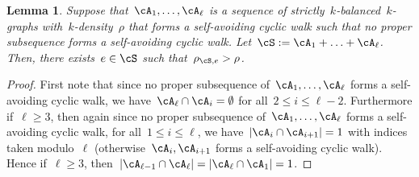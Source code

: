 \documentclass[11pt]{amsart}
\DeclarePairedDelimiter{\abs}{\lvert}{\rvert}
\newtheorem{lemma}[algocf]{Lemma}
\theoremstyle{definition}
\numberwithin{equation}{section}
\begin{document}
	\begin{lemma}\label{lemma: minimal strictly balanced gluing rest density}
		Suppose that~$\cA_1,\ldots,\cA_\ell$ is a sequence of strictly~$k$-balanced~$k$-graphs with~$k$-density~$\rho$ that forms a self-avoiding cyclic walk such that no proper subsequence forms a self-avoiding cyclic walk.
		Let~$\cS:=\cA_1+\ldots+\cA_\ell$.
		Then, there exists~$e\in\cS$ such that~$\rho_{\cS,e}>\rho$.
	\end{lemma}
	\begin{proof}
		First note that since no proper subsequence of~$\cA_1,\ldots,\cA_\ell$ forms a self-avoiding cyclic walk, we have~$\cA_\ell\cap \cA_i=\emptyset$ for all~$2\leq i\leq\ell-2$.
		Furthermore if~$\ell\geq 3$, then again since no proper subsequence of~$\cA_1,\ldots,\cA_\ell$ forms a self-avoiding cyclic walk, for all~$1\leq i\leq\ell$, we have~$\abs{\cA_{i}\cap \cA_{i+1}}=1$ with indices taken modulo~$\ell$ (otherwise~$\cA_i,\cA_{i+1}$ forms a self-avoiding cyclic walk).
		Hence if~$\ell\geq 3$, then~$\abs{\cA_{\ell-1}\cap\cA_\ell}=\abs{\cA_\ell\cap \cA_1}=1$.
		

\end{proof}
\end{document}
